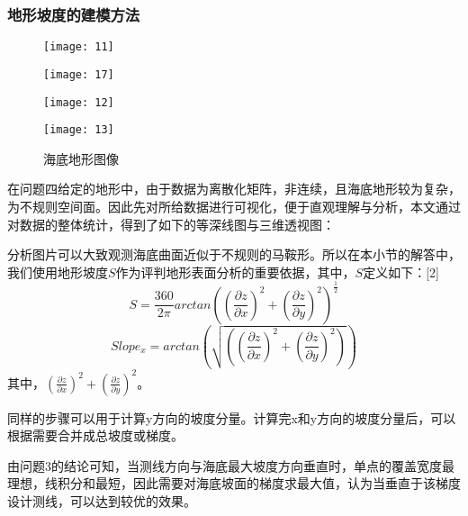 \documentclass[withoutpreface,bwprint]{cumcmthesis} %
\begin{document}
\subsubsection{地形坡度的建模方法}
\begin{figure}[H]
    \centering
    \begin{minipage}[c]{0.48\textwidth}
        \centering
        \texttt{[image: 11]}
    \end{minipage}
 \begin{minipage}[c]{0.48\textwidth}
        \centering
        \texttt{[image: 17]}
    \end{minipage}
    \begin{minipage}[c]{0.48\textwidth}
        \centering
        \texttt{[image: 12]}
    \end{minipage}
\begin{minipage}[c]{0.48\textwidth}
        \centering
        \texttt{[image: 13]}
    \end{minipage}
    \caption{海底地形图像}
\end{figure}
在问题四给定的地形中，由于数据为离散化矩阵，非连续，且海底地形较为复杂，为不规则空间面。因此先对所给数据进行可视化，便于直观理解与分析，本文通过对数据的整体统计，得到了如下的等深线图与三维透视图：

分析图片可以大致观测海底曲面近似于不规则的马鞍形。所以在本小节的解答中，我们使用地形坡度$S$作为评判地形表面分析的重要依据，其中，$S$定义如下：[2]
\begin{equation}
S=\frac{360}{2\pi}arctan((\frac{\partial z}{\partial x})^2+(\frac{\partial z}{\partial y})^2)^{\frac{1}{2}}
\end{equation}
\begin{equation}
Slope_x = arctan(\sqrt{((\frac{\partial z}{\partial x})^2 + (\frac{\partial z}{\partial y})^2)})
\end{equation}
其中，$(\frac{\partial z}{\partial x})^2+(\frac{\partial z}{\partial y})^2$。

同样的步骤可以用于计算y方向的坡度分量。计算完x和y方向的坡度分量后，可以根据需要合并成总坡度或梯度。

由问题3的结论可知，当测线方向与海底最大坡度方向垂直时，单点的覆盖宽度最理想，线积分和最短，因此需要对海底坡面的梯度求最大值，认为当垂直于该梯度设计测线，可以达到较优的效果。
\end{document}
